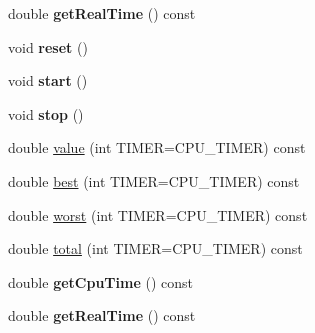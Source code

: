 \begin{DoxyCompactItemize}
double {\bfseries get\+Real\+Time} () const
\item 
\mbox{\label{class_eigen_1_1_bench_timer_a32a7276d10363d2d166234d7fb07182a}} 
void {\bfseries reset} ()
\item 
\mbox{\label{class_eigen_1_1_bench_timer_a6b01cc1c0408353022174b867ab29dc9}} 
void {\bfseries start} ()
\item 
\mbox{\label{class_eigen_1_1_bench_timer_a367e14b2e9c1ab6d3f0ff7bcfcd5ee37}} 
void {\bfseries stop} ()
\item 
double \hyperlink{class_eigen_1_1_bench_timer_a26760f963ed8b64c126159bfea57735e}{value} (int T\+I\+M\+ER=C\+P\+U\+\_\+\+T\+I\+M\+ER) const
\item 
double \hyperlink{class_eigen_1_1_bench_timer_ae8b673b0fa356d3432c7a65c79e8af0e}{best} (int T\+I\+M\+ER=C\+P\+U\+\_\+\+T\+I\+M\+ER) const
\item 
double \hyperlink{class_eigen_1_1_bench_timer_ab912bf8bcae22898c85d907f0810173e}{worst} (int T\+I\+M\+ER=C\+P\+U\+\_\+\+T\+I\+M\+ER) const
\item 
double \hyperlink{class_eigen_1_1_bench_timer_af341aa613dba2d4a3d167093197e4e7a}{total} (int T\+I\+M\+ER=C\+P\+U\+\_\+\+T\+I\+M\+ER) const
\item 
\mbox{\label{class_eigen_1_1_bench_timer_a5e1faf3cf0c7958128fc4ad10377f51c}} 
double {\bfseries get\+Cpu\+Time} () const
\item 
\mbox{\label{class_eigen_1_1_bench_timer_af215200501091952ffa5e919fe31cfca}} 
double {\bfseries get\+Real\+Time} () const
\end{DoxyCompactItemize}
